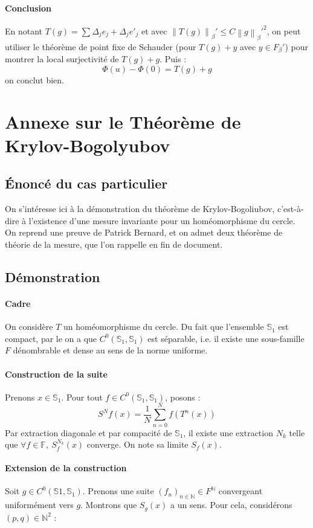 \documentclass[11pt,a4paper]{article}
\begin{document}
\paragraph{Conclusion}
En notant $T(g) = \sum \Delta_j e_j + \Delta_j e'_j$ et avec $\left\|T(g) \right\|_\beta' \leq C \left\|g \right\|_\beta'^2$, on peut utiliser le théorème de point fixe de Schauder (pour $T(g) + y$ avec $y \in F_\beta'$) pour montrer la local surjectivité de $T(g) + g$. Puis :
\[ 
\Phi(u) - \Phi(0) = T(g) + g
\]
on conclut bien.
\newpage
\section{Annexe sur le Théorème de Krylov-Bogolyubov}

\subsection*{Énoncé du cas particulier}
On s'intéresse ici à la démonstration du théorème de Krylov-Bogoliubov, c'est-à-dire à l'existence d'une mesure invariante pour un homéomorphisme du cercle. On reprend une preuve de Patrick Bernard, et on admet deux théorème de théorie de la mesure, que l'on rappelle en fin de document.

\subsection*{Démonstration}

\paragraph{Cadre}
On considère $T$ un homéomorphisme du cercle. Du fait que l'ensemble $\mathbb{S}_1$ est compact, par le  on a que $C^0(\mathbb{S}_1,\mathbb{S}_1)$ est séparable, i.e. il existe une sous-famille $F$ dénombrable et dense au sens de la norme uniforme.

\paragraph{Construction de la suite}
Prenons $x \in \mathbb{S}_1$.
Pour tout $f \in C^0(\mathbb{S}_1,\mathbb{S}_1)$, posons :
\[
{S^N}f (x)= \frac{1}{N} \sum_{n=0}^N f(T^n(x))
\]
Par extraction diagonale et par compacité de $\mathbb{S}_1$, il existe une extraction $N_k$ telle que $\forall f \in \mathbb{F}, \: S^{N_k}_f (x)$ converge. On note sa limite $S_f (x)$.

\paragraph{Extension de la construction}
Soit $g \in C^0(\mathbb{S}1,\mathbb{S}_1)$. Prenons une suite $(f_n)_{n \in \mathbb{N}} \in F^\mathbb{N}$ convergeant uniformément vers $g$.
Montrons que $S_g (x)$ a un sens. Pour cela, considérons $(p, q) \in \mathbb{N}^2$ :
\end{document}
